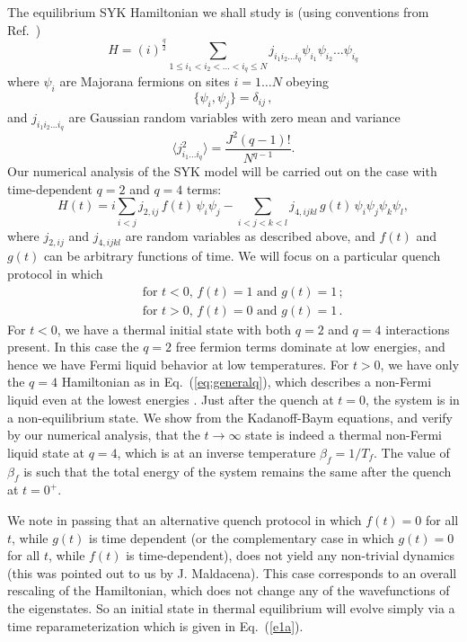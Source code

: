 \documentclass[prx,aps,onecolumn,amsfonts,showpacs,superscriptaddress,preprint,eqsecnum]
{revtex4-1}
\newcommand{\beq}{\begin{equation}}
\newcommand{\eeq}{\end{equation}}
\def\bea{\begin{eqnarray}}
\def\eea{\end{eqnarray}}
\newcommand{\nn}{\nonumber \\}
\begin{document}
The equilibrium SYK Hamiltonian we shall study is (using conventions from 
Ref.~)
	\begin{equation}
H=(i)^{\frac{q}{2}}\sum_{1\leq i_{1}<i_{2}<...<i_{q}\leq N} 
j_{i_{1}i_{2}...i_{q}}\psi_{i_{1}}\psi_{i_{2}}...\psi_{i_{q}} 
\label{eq:generalq}
\end{equation}
where $\psi_i$ are Majorana fermions on sites $i = 1 \ldots N$ obeying
\beq
\{ \psi_i , \psi_j \} = \delta_{ij} \,,
\eeq
and $j_{i_{1}i_{2}...i_{q}}$ are Gaussian random variables with zero mean and 
variance
\begin{equation}
\langle j^{2}_{i_{1}...i_{q}}\rangle=\frac{J^{2}(q-1)!}{N^{q-1}}.
\label{eq:variance}
\end{equation}
Our numerical analysis of the SYK model will be carried out on the case with   
time-dependent $q=2$ and 
$q=4$ terms:
\begin{equation}
	H(t) = i \sum_{i < j} j_{2,ij} \, f(t) \, \psi_i \psi_j - \sum_{i < j < k < l} 
j_{4,ijkl} \, g(t) \, \psi_i \psi_j \psi_k \psi_l,
\label{eq:Hamiltonian}
\end{equation}
where $j_{2,ij}$ and $j_{4,ijkl}$ are random variables as described above, and 
$f(t)$ and $g(t)$ can be arbitrary functions of time. We will focus
on a particular quench protocol in which
\bea
&& \mbox{for $t < 0$, $f(t) = 1$ and $g(t) = 1$}\,;\nn	
&& \mbox{for $t > 0$, $f(t) = 0$ and $g(t) = 1$}\,.
\eea
For $t<0$, we have a thermal initial state with both $q=2$ and $q=4$ interactions present. In this case the $q=2$ free fermion terms dominate at low energies, and hence we have Fermi liquid
behavior at low temperatures.
For $t>0$, we have only the $q=4$ Hamiltonian as in Eq.~(\ref{eq:generalq}), which describes a 
non-Fermi liquid even at the lowest energies \cite{sy}. Just after the quench at $t=0$, the system
is in a non-equilibrium state. We show from the Kadanoff-Baym equations, and verify by our numerical
analysis, that the $t \rightarrow \infty$ state is indeed a thermal non-Fermi liquid state at $q=4$, which is at an inverse
temperature $\beta_f = 1/T_f$. The value of $\beta_f$ 
is such that the total energy of the system remains the same after the quench at $t=0^+$.

We note in passing that an alternative quench protocol in which $f(t) = 0$ for all $t$, while $g(t)$ is
time dependent (or the complementary case in which $g(t)=0$ for all $t$, while $f(t)$ is time-dependent), does not yield any non-trivial dynamics (this was pointed out to us by J. Maldacena). This case corresponds to an overall rescaling of
the Hamiltonian, which does not change any of the wavefunctions of the eigenstates. So an initial state in thermal equilibrium will evolve simply via a time reparameterization which
is given in Eq.~(\ref{e1a}).
\end{document}
